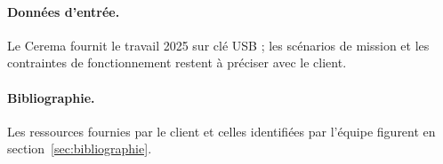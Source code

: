 \paragraph{Données d'entrée.} Le Cerema fournit le travail 2025 sur clé USB ; les scénarios de mission et les contraintes de fonctionnement restent à préciser avec le client.

\paragraph{Bibliographie.} Les ressources fournies par le client et celles identifiées par l'équipe figurent en section~\ref{sec:bibliographie}.
\\
